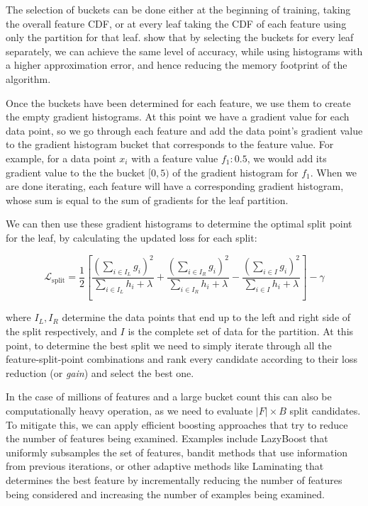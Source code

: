 The selection of buckets can be done either at the beginning of training, taking the
overall feature CDF, or at every leaf taking the CDF of each feature using only the
partition for that leaf. \citet{xgboost} show that by selecting the buckets for every
leaf separately, we can achieve the same level of accuracy, while using histograms with a higher approximation error, and hence reducing the memory footprint of the algorithm.

Once the buckets have been determined for each feature, we use them to create
the empty gradient histograms. At this point we have a gradient value for each data point, so
we go through each feature and add the data point's gradient value to the gradient
histogram bucket
that corresponds to the feature value.
For example, for a data point $x_i$ with a feature value $f_1 : 0.5$, we would add its
gradient value to the
the bucket $[0, 5)$ of the gradient histogram for $f_1$.
When we are done iterating, each feature will have a corresponding gradient histogram,
whose sum is equal to the sum of gradients for the leaf partition.

We can then use these gradient histograms to determine the optimal split point for the
leaf, by calculating the updated loss for each split:

\begin{equation}
	\mathcal{L}_{\text{split}} = \frac{1}{2} \left[\frac{\left(\sum_{i \in I_{L}} g_{i} \right)^{2}} {\sum_{i \in I_{L}} h_{i}+ \lambda} + \frac{\left(\sum_{i \in I_{R}} g_{i} \right)^{2}}{\sum_{i \in I_{R}} h_{i} + \lambda} - \frac{\left(\sum_{i \in I}g_{i}\right)^{2}}{\sum_{i \in I}h_{i}+\lambda}\right]-\gamma
\end{equation}

where $I_L, I_R$ determine the data points that end up to the left and right side of the split
respectively, and $I$ is the complete set of data for the partition. At this point, to determine
the best split we need to simply iterate through all the feature-split-point combinations
and rank every candidate according to their loss reduction (or \textit{gain}) and select the
best one.

In the case of millions of features and a large bucket count this can also be
computationally heavy operation, as we need to evaluate $|F| \times B$ split candidates.
To mitigate this, we can apply efficient boosting approaches that try
to reduce the number of features being examined. Examples include LazyBoost \cite{lazyboost}
that uniformly subsamples the set of features,
bandit methods \cite{bandits-boosting} that use information from previous iterations, or other adaptive
methods like Laminating \cite{laminating} that determines the best feature by incrementally
reducing the number of features being considered and increasing the number of examples being
examined.

